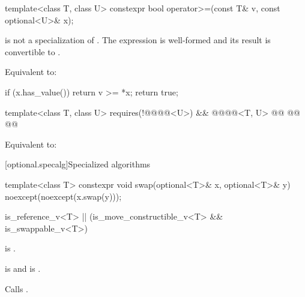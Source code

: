 %
\begin{itemdecl}
template<class T, class U>
  constexpr bool operator>=(const T& v, const optional<U>& x);
\end{itemdecl}

\begin{itemdescr}
\pnum
\constraints
{} is not a specialization of . The expression  is well-formed and its result is convertible to .

\pnum
\effects
Equivalent to:
\begin{codeblock}
if (x.has_value())
  return v >= *x;
return true;
\end{codeblock}
\end{itemdescr}

%
\begin{itemdecl}
template<class T, class U>
  requires(!@@@@<U>) && @@@@<T, U>
  @@
    @@
  @@
\end{itemdecl}

\begin{itemdescr}
\pnum
\effects
Equivalent to: 
\end{itemdescr}

[optional.specalg]{Specialized algorithms}

%
\begin{itemdecl}
template<class T>
  constexpr void swap(optional<T>& x, optional<T>& y) noexcept(noexcept(x.swap(y)));
\end{itemdecl}

\begin{itemdescr}
\begin{removedblock}
\pnum
\constraints
\begin{codeblock}
is_reference_v<T> || (is_move_constructible_v<T> && is_swappable_v<T>)
\end{codeblock}
\end{removedblock}
\begin{removedblock}
is .
\end{removedblock}

\begin{addedblock}
\pnum
{} is  and  is .
\end{addedblock}

\pnum
\effects
Calls .
\end{itemdescr}

